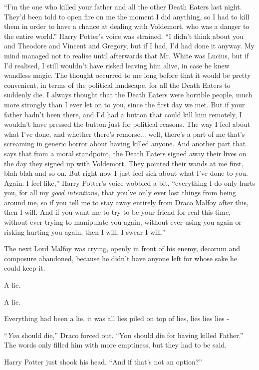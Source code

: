 ``I'm the one who killed your father and all the other Death Eaters last night. They'd been told to open fire on me the moment I did anything, so I had to kill them in order to have a chance at dealing with Voldemort, who was a danger to the entire world.'' Harry Potter's voice was strained. ``I didn't think about you and Theodore and Vincent and Gregory, but if I had, I'd had done it anyway. My mind managed not to realise until afterwards that Mr. White was Lucius, but if I'd realised, I still wouldn't have risked leaving him alive, in case he knew wandless magic. The thought occurred to me long before that it would be pretty convenient, in terms of the political landscape, for all the Death Eaters to suddenly die. I always thought that the Death Eaters were horrible people, much more strongly than I ever let on to you, since the first day we met. But if your father hadn't been there, and I'd had a button that could kill him remotely, I wouldn't have pressed the button just for political reasons. The way I feel about what I've done, and whether there's remorse... well, there's a part of me that's screaming in generic horror about having killed anyone. And another part that says that from a moral standpoint, the Death Eaters signed away their lives on the day they signed up with Voldemort. They pointed their wands at me first, blah blah and so on. But right now I just feel sick about what I've done to you. Again. I feel like,'' Harry Potter's voice wobbled a bit, ``everything I do only hurts you, for all my \emph{good intentions,} that you've only ever lost things from being around me, so if you tell me to stay away entirely from Draco Malfoy after this, then I will. And if you want me to try to be your friend for real this time, without ever trying to manipulate you again, without ever using you again or risking hurting you again, then I will, I swear I will.''

The next Lord Malfoy was crying, openly in front of his enemy, decorum and composure abandoned, because he didn't have anyone left for whose sake he could keep it.

A lie.

A lie.

Everything had been a lie, it was all lies piled on top of lies, lies lies lies -

``\emph{You} should die,'' Draco forced out. ``You should die for having killed Father.'' The words only filled him with more emptiness, but they had to be said.

Harry Potter just shook his head. ``And if that's not an option?''

